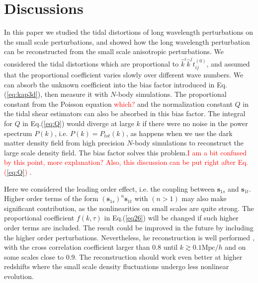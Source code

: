 \documentclass[aps,prd,twocolumn,showpacs,superscriptaddress,groupedaddress,nofootinbib]{revtex4}  %
\newcommand{\mr}{\mathrm}
\newcommand{\mb}{\mathbf}
\begin{document}
\section{Discussions}
In this paper we studied the tidal distortions of long wavelength perturbations on 
the small scale perturbations, and showed how the long wavelength perturbation can 
be reconstructed from the small scale anisotropic perturbations. 
We considered the tidal distortions  which are
 proportional to $\hat{k}^i\hat{k}^jt_{ij}^{(0)}$, and assumed that the
proportional coefficient varies slowly over different wave numbers.
We can absorb the unknown coefficient into the bias factor introduced
in Eq.(\ref{eq:kap3d}), then measure it  with $N$-body 
simulations. The proportional constant from the Poisson equation \textcolor{red}{which?}
and the normalization constant $Q$ in the tidal shear estimators can also be absorbed
in this bias factor. 
The integral for $Q$ in Eq.(\ref{eq:Q}) would diverge at large $k$ if
there were no noise in the power spectrum $P(k)$, i.e. $P(k)=P_{tot}(k)$, 
as happens when we use the 
dark matter density field from high precision $N$-body simulations to
reconstruct the large scale density field. The bias factor solves 
this problem.\textcolor{red}{I am a bit confused by this point, more explanation? Also, 
this discussion can be put right after Eq.(\ref{eq:Q}) }.


Here we considered the leading order effect, i.e. the coupling between $\mb{s}_{1s}$ and $\mb{s}_{1t}$. 
 Higher order terms of the form $(\mb{s}_{1s})^n\mb{s}_{1t}$  with $(n>1)$ may also make 
significant contribution,  as the nonlinearities on small scales are quite strong. 
The proportional coefficient $f(k,\tau)$ in Eq.(\ref{eq26}) will be changed  if such higher
order terms are included. The result could be improved in the future by including the higher 
order perturbations. Nevertheless, 
he reconstruction is well performed , with the cross correlation coefficient larger than 0.8
until $k\gtrsim0.1\mr{Mpc}/h$ and on some scales close to 0.9.
The reconstruction should work even better
at higher redshifts where  the small scale density
fluctuations undergo less nonlinear evolution. 
\end{document}
